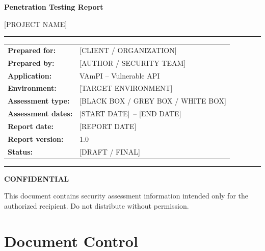 \documentclass[11pt,a4paper]{report}
\newcommand{\ReportTitle}{Penetration Testing Report}
\newcommand{\ClientName}{[CLIENT / ORGANIZATION]}
\newcommand{\ProjectName}{[PROJECT NAME]}
\newcommand{\PreparedBy}{[AUTHOR / SECURITY TEAM]}
\newcommand{\ReportDate}{[REPORT DATE]}
\newcommand{\AssessmentStart}{[START DATE]}
\newcommand{\AssessmentEnd}{[END DATE]}
\newcommand{\TargetEnvironment}{[TARGET ENVIRONMENT]}
\newcommand{\TargetApplication}{VAmPI -- Vulnerable API}
\newcommand{\ReportVersion}{1.0}
\newcommand{\Classification}{CONFIDENTIAL}
\newcommand{\TestingType}{[BLACK BOX / GREY BOX / WHITE BOX]}
\newcommand{\ReportStatus}{[DRAFT / FINAL]}
\begin{document}
\begin{titlepage}
    \thispagestyle{empty}
    \vspace*{18mm}

    {\Large\bfseries \ReportTitle\par}
    \vspace{4mm}
    {\large \ProjectName\par}

    \vspace{18mm}
    \hrule height 0.8pt
    \vspace{10mm}

    \begin{tabularx}{\textwidth}{@{}>{\bfseries}p{43mm}Y@{}}
        Prepared for: & \ClientName \\
        Prepared by: & \PreparedBy \\
        Application: & \TargetApplication \\
        Environment: & \TargetEnvironment \\
        Assessment type: & \TestingType \\
        Assessment dates: & \AssessmentStart\ -- \AssessmentEnd \\
        Report date: & \ReportDate \\
        Report version: & \ReportVersion \\
        Status: & \ReportStatus \\
    \end{tabularx}

    \vfill
    \hrule height 0.4pt
    \vspace{4mm}
    {\small\bfseries \Classification\par}
    {\small This document contains security assessment information intended
    only for the authorized recipient. Do not distribute without permission.\par}
\end{titlepage}


\chapter*{Document Control}
\end{document}

